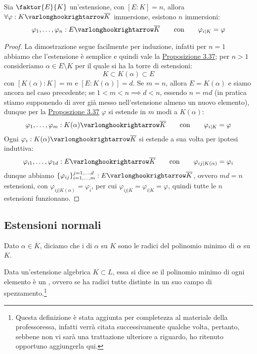 \documentclass[11pt]{scrartcl}
\begin{document}
\begin{corollary}
    \label{3.39}
    Sia $\faktor{E}{K}$ un'estensione, con $[E:K] = n$, allora $\forall \varphi : K \varlonghookrightarrow \overline K$ immersione, esistono $n$ immersioni:
    \[ \varphi_1,\ldots,\varphi_n : E \varlonghookrightarrow \overline K \qquad \text{con} \qquad \varphi_{i|K} = \varphi
        \]
\end{corollary}

\begin{proof}
    La dimostrazione segue facilmente per induzione, infatti per $n = 1$ abbiamo che l'estensione è semplice e quindi vale la \hyperref[3.37]{Proposizione 3.37}; per $n>1$ consideriamo
    $\alpha \in E \setminus K$ per il quale si ha la torre di estensioni:
    \[ K \subset K(\alpha) \subset E
        \]
    con $[K(\alpha) : K] = m$ e $[E : K(\alpha)] = d$. Se $m = n$, allora $E = K(\alpha)$ e siamo ancora nel caso precedente; se $1 < m < n \implies d < n$,
    essendo $n = md$ (in pratica stiamo supponendo di aver già messo nell'estensione almeno un nuovo elemento), dunque per la \hyperref[3.37]{Proposzione 3.37} $\varphi$ si estende in $m$ modi a $K(\alpha)$:
    \[ \varphi_1,\ldots,\varphi_m : K(\alpha) \varlonghookrightarrow \overline K \qquad \text{con} \qquad \varphi_{i|K} = \varphi
        \]
    Ogni $\varphi_i : K(\alpha) \varlonghookrightarrow \overline K$ si estende a sua volta per ipotesi induttiva:
    \[ \varphi_{i1},\ldots,\varphi_{1d} : E \varlonghookrightarrow \overline K \qquad \text{con} \qquad \varphi_{ij|K(\alpha)} = \varphi_i
        \]
    dunque abbiamo $\{\varphi_{ij}\}_{i = 1,\ldots,m}^{j = 1,\ldots,d} : E \varlonghookrightarrow \overline K$, ovvero $md = n$ estensioni, con $\varphi_{ij | K(\alpha)} = \varphi_i $, per cui $\varphi_{ij|K} = \varphi_{i | K} = \varphi$, quindi tutte le $n$ estensioni funzionano.
\end{proof}

\newpage
\subsection{Estensioni normali}

\begin{definition}
    Dato $\alpha \in \overline K$, diciamo che i  di $\alpha$ su $K$ sono le radici del polinomio minimo di $\alpha$ su $K$. 
\end{definition}

\begin{definition}
    Data un'estensione algebrica $K \subset L$, essa si dice  se il polinomio minimo di ogni elemento è un
    , ovvero se ha radici tutte distinte in un suo campo di spezzamento.\footnote{Questa definizione
    è stata aggiunta per completezza al materiale della professoressa, infatti verrà citata successivamente qualche volta, pertanto, sebbene non vi sarà una trattazione ulteriore 
    a riguardo, ho ritenuto opportuno aggiungerla qui.}
\end{definition}
\end{document}
